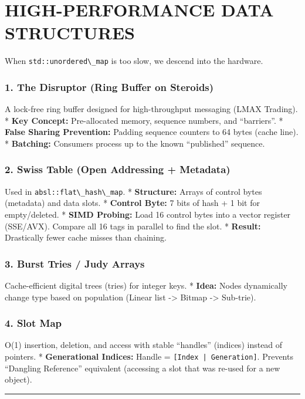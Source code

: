 \hypertarget{high-performance-data-structures}{%
\chapter{HIGH-PERFORMANCE DATA
STRUCTURES}\label{high-performance-data-structures}}

When \passthrough{\lstinline!std::unordered\_map!} is too slow, we
descend into the hardware.

\hypertarget{the-disruptor-ring-buffer-on-steroids}{%
\subsection{1. The Disruptor (Ring Buffer on
Steroids)}\label{the-disruptor-ring-buffer-on-steroids}}

A lock-free ring buffer designed for high-throughput messaging (LMAX
Trading). * \textbf{Key Concept:} Pre-allocated memory, sequence
numbers, and ``barriers''. * \textbf{False Sharing Prevention:} Padding
sequence counters to 64 bytes (cache line). * \textbf{Batching:}
Consumers process up to the known ``published'' sequence.

\hypertarget{swiss-table-open-addressing-metadata}{%
\subsection{2. Swiss Table (Open Addressing +
Metadata)}\label{swiss-table-open-addressing-metadata}}

Used in \passthrough{\lstinline!absl::flat\_hash\_map!}. *
\textbf{Structure:} Arrays of control bytes (metadata) and data slots. *
\textbf{Control Byte:} 7 bits of hash + 1 bit for empty/deleted. *
\textbf{SIMD Probing:} Load 16 control bytes into a vector register
(SSE/AVX). Compare all 16 tags in parallel to find the slot. *
\textbf{Result:} Drastically fewer cache misses than chaining.

\hypertarget{burst-tries-judy-arrays}{%
\subsection{3. Burst Tries / Judy
Arrays}\label{burst-tries-judy-arrays}}

Cache-efficient digital trees (tries) for integer keys. * \textbf{Idea:}
Nodes dynamically change type based on population (Linear list
-\textgreater{} Bitmap -\textgreater{} Sub-trie).

\hypertarget{slot-map}{%
\subsection{4. Slot Map}\label{slot-map}}

O(1) insertion, deletion, and access with stable ``handles'' (indices)
instead of pointers. * \textbf{Generational Indices:} Handle =
\passthrough{\lstinline![Index | Generation]!}. Prevents ``Dangling
Reference'' equivalent (accessing a slot that was re-used for a new
object).

\begin{center}\rule{0.5\linewidth}{0.5pt}\end{center}
